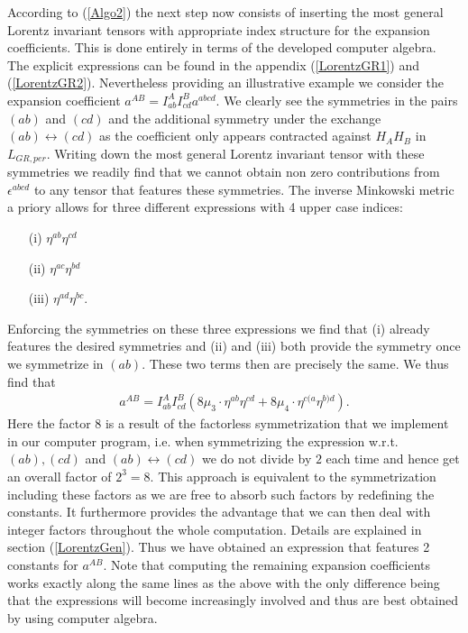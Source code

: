 \documentclass[a4paper,12pt, DIV=14, BCOR=5mm, twoside, headsepline]{scrbook}
\begin{document}
According to (\ref{Algo2}) the next step now consists of inserting the most general Lorentz invariant tensors with appropriate index structure for the expansion coefficients. This is done entirely in terms of the developed computer algebra. The explicit expressions can be found in the appendix (\ref{LorentzGR1}) and (\ref{LorentzGR2}).
Nevertheless providing an illustrative example we consider the expansion coefficient $a^{AB} = I^{A}_{ab}I^{B}_{cd}a^{abcd}$. We clearly see the symmetries in the pairs $(ab)$ and $(cd)$ and the additional symmetry under the exchange $(ab) \leftrightarrow (cd)$ as the coefficient only appears contracted against $H_AH_B$ in $L_{GR,per}$. Writing down the most general Lorentz invariant tensor with these symmetries we readily find that we cannot obtain non zero contributions from $\epsilon^{abcd}$ to any tensor that features these symmetries. The inverse Minkowski metric a priory allows for three different expressions with 4 upper case indices:
\begin{itemize}
    \item[(i)] $\eta^{ab} \eta^{cd}$ 
    \item[(ii)] $\eta^{ac} \eta^{bd}$ 
    \item[(iii)] $\eta^{ad} \eta^{bc}$.
\end{itemize}
Enforcing the symmetries on these three expressions we find that (i) already features the desired symmetries and (ii) and (iii) both provide the symmetry once we symmetrize in $(ab)$. These two terms then are precisely the same. We thus find that 
\begin{align}\label{ansatzExample}
    a^{AB} = I^{A}_{ab}I^{B}_{cd} \left ( 8\mu_3 \cdot \eta^{ab}\eta^{cd} + 8\mu_4 \cdot \eta^{c(a} \eta^{b)d}   \right ).
\end{align}
Here the factor $8$ is a result of the factorless symmetrization that we implement in our computer program, i.e. when symmetrizing the expression w.r.t. $(ab),(cd)$ and $(ab) \leftrightarrow (cd) $ we do not divide by $2$ each time and hence get an overall factor of $2^3=8$. This approach is equivalent to the symmetrization including these factors as we are free to absorb such factors by redefining the constants. It furthermore provides the advantage that we can then deal with integer factors throughout the whole computation. Details are explained in section (\ref{LorentzGen}).
Thus we have obtained an expression that features 2 constants for $a^{AB}$.
Note that computing the remaining expansion coefficients works exactly along the same lines as the above with the only difference being that the expressions will become increasingly involved and thus are best obtained by using computer algebra.
\end{document}
